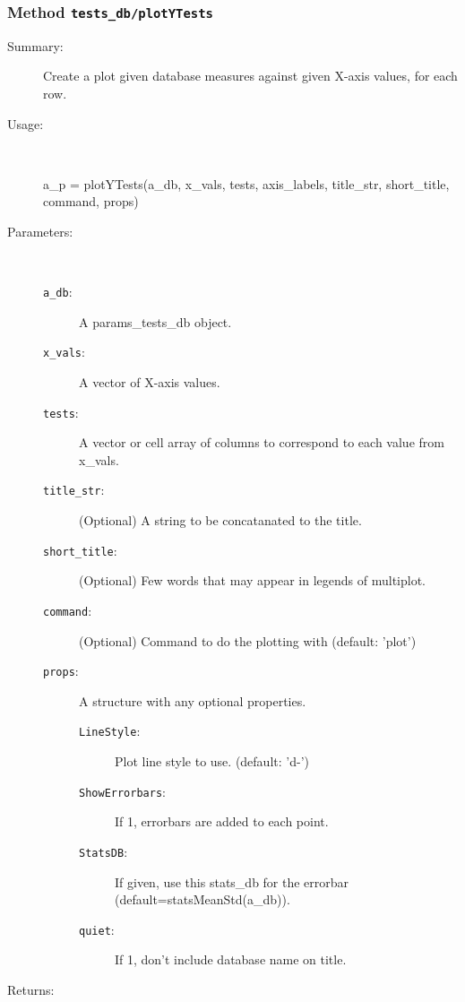 \subsubsection[Method \texttt{plotYTests}]{Method \texttt{tests\_db/plotYTests}}%
%
\label{ref_tests_db__plotYTests}%
\hypertarget{ref_tests_db__plotYTests}{}%
\begin{description}
\item[Summary:]Create a plot given database measures against given X-axis values, for each row.
%
\item[Usage:]~%
\begin{lyxcode}%
a\_p = plotYTests(a\_db, x\_vals, tests, axis\_labels, title\_str, short\_title, command, props)
%
\end{lyxcode}%
%
%
\item[Parameters:]~
\begin{description}%
\item[\texttt{a\_db}:]
 A params\_tests\_db object.
\item[\texttt{x\_vals}:]
 A vector of X-axis values.
\item[\texttt{tests}:]
 A vector or cell array of columns to correspond to each value from x\_vals.
\item[\texttt{title\_str}:]
 (Optional) A string to be concatanated to the title.
\item[\texttt{short\_title}:]
 (Optional) Few words that may appear in legends of multiplot.
\item[\texttt{command}:]
 (Optional) Command to do the plotting with (default: 'plot')
\item[\texttt{props}:]
 A structure with any optional properties.
\begin{description}%
\item[\texttt{LineStyle}:]
 Plot line style to use. (default: 'd-')
\item[\texttt{ShowErrorbars}:]
 If 1, errorbars are added to each point.
\item[\texttt{StatsDB}:]
 If given, use this stats\_db for the errorbar (default=statsMeanStd(a\_db)).
\item[\texttt{quiet}:]
 If 1, don't include database name on title.
\end{description}%
\end{description}%
%
\item[Returns:]~


\end{description}
